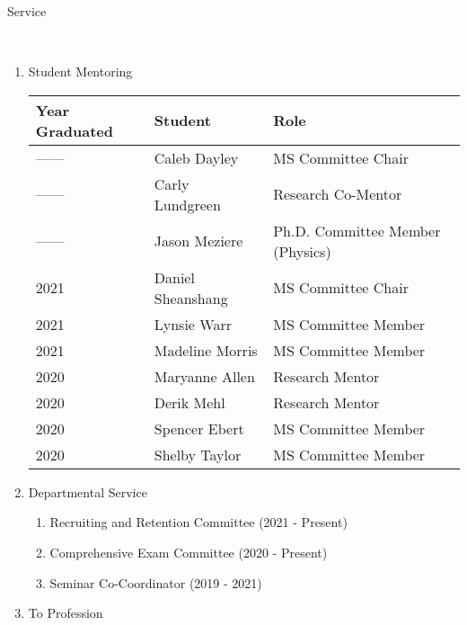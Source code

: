 \documentclass[11pt]{article}
\newcommand{\head}[1]{ %
    \bigskip %
    \begin{large}\begin{bf}{#1}\end{bf}\end{large} %

    \ \\ [-1.3cm] %

    \hrulefill}
\begin{document}
\head{Service}
\begin{enumerate}[label=$\bullet$]

\item Student Mentoring

\begin{table}[H]
\centering
\begin{tabular}{lll}
  \hline
Year Graduated & Student & Role \\ 
  \hline
  ------ & Caleb Dayley & MS Committee Chair \\
  ------  & Carly Lundgreen & Research Co-Mentor  \\ 
  ------ & Jason Meziere & Ph.D. Committee Member (Physics) \\
2021  & Daniel Sheanshang & MS Committee Chair  \\ 
2021  & Lynsie Warr & MS Committee Member  \\ 
2021  & Madeline Morris & MS Committee Member  \\ 
2020  & Maryanne Allen & Research Mentor  \\ 
2020  & Derik Mehl & Research Mentor \\ 
2020  & Spencer Ebert & MS Committee Member  \\ 
2020  & Shelby Taylor & MS Committee Member  \\ 
   \hline
\end{tabular}
\end{table}


\item Departmental Service
\begin{enumerate}[label=$\cdot$]
\item Recruiting and Retention Committee (2021 - Present)
\item Comprehensive Exam Committee (2020 - Present)
\item Seminar Co-Coordinator (2019 - 2021)

\end{enumerate}

\item To Profession




\end{enumerate}
\end{document}
